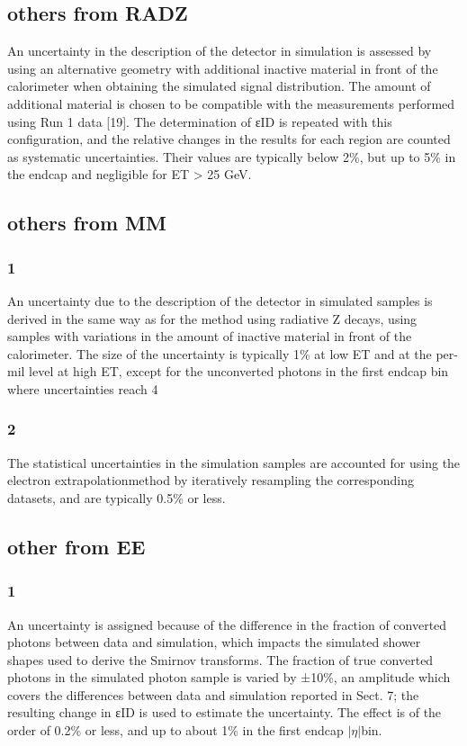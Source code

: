 \documentclass{ctexart}
\begin{document}
\subsection{others from RADZ}
An uncertainty in the description of the detector in simulation
is assessed by using an alternative geometry with
additional inactive material in front of the calorimeter
when obtaining the simulated signal distribution. The
amount of additional material is chosen to be compatible with the measurements performed using Run 1 data [19].
The determination of εID is repeated with this configuration,
and the relative changes in the results for each
region are counted as systematic uncertainties. Their values
are typically below 2\%, but up to 5\% in the endcap
and negligible for ET > 25 GeV. 
\subsection{others from MM}
\subsubsection{1}
An uncertainty due to the description of the detector in
simulated samples is derived in the same way as for the
method using radiative Z decays, using samples with
variations in the amount of inactive material in front of
the calorimeter. The size of the uncertainty is typically
1\% at low ET and at the per-mil level at high ET, except
for the unconverted photons in the first endcap bin where
uncertainties reach 4%
\subsubsection{2}
The statistical uncertainties in the simulation samples are
accounted for using the electron extrapolationmethod by
iteratively resampling the corresponding datasets, and are
typically 0.5\% or less.
\subsection{other from EE}
\subsubsection{1}
An uncertainty is assigned because of the difference in
the fraction of converted photons between data and simulation,
which impacts the simulated shower shapes used
to derive the Smirnov transforms. The fraction of true
converted photons in the simulated photon sample is
varied by ±10\%, an amplitude which covers the differences
between data and simulation reported in Sect. 7;
the resulting change in εID is used to estimate the uncertainty.
The effect is of the order of 0.2\% or less, and up
to about 1\% in the first endcap $|\eta|$bin.
\end{document}
